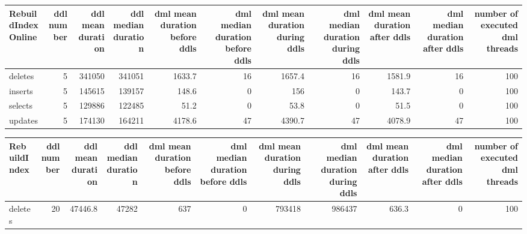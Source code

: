 \begin{tabular}{lrrrrrrrrrr}
\hline
\end{tabular}\begin{tabular}{lrrrrrrrrrr}
\hline
 RebuildIndexOnline   &   ddl number &   ddl mean duration &   ddl median duration &   dml mean duration before ddls &   dml median duration before ddls &   dml mean duration during ddls &   dml median duration during ddls &   dml mean duration after ddls &   dml median duration after ddls &   number of executed dml threads \\
\hline
 deletes              &            5 &              341050 &                341051 &                          1633.7 &                                16 &                          1657.4 &                                16 &                         1581.9 &                               16 &                              100 \\
 inserts              &            5 &              145615 &                139157 &                           148.6 &                                 0 &                           156   &                                 0 &                          143.7 &                                0 &                              100 \\
 selects              &            5 &              129886 &                122485 &                            51.2 &                                 0 &                            53.8 &                                 0 &                           51.5 &                                0 &                              100 \\
 updates              &            5 &              174130 &                164211 &                          4178.6 &                                47 &                          4390.7 &                                47 &                         4078.9 &                               47 &                              100 \\
\hline
\end{tabular}\begin{tabular}{lrrrrrrrrrr}
\hline
 RebuildIndex   &   ddl number &   ddl mean duration &   ddl median duration &   dml mean duration before ddls &   dml median duration before ddls &   dml mean duration during ddls &   dml median duration during ddls &   dml mean duration after ddls &   dml median duration after ddls &   number of executed dml threads \\
\hline
 deletes        &           20 &             47446.8 &               47282   &                           637   &                                 0 &                          793418 &                            986437 &                          636.3 &                                0 &                              100 \\

\end{tabular}
